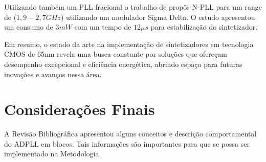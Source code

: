 Utilizando também um PLL fracional o trabalho de \cite{lee2017design} propôs N-PLL para um range de ($1,9-2,7GHz$) utilizando um modulador Sigma Delta.  O estudo apresentou um consumo de $3mW$ com um tempo de $12\mu s$ para estabilização do sintetizador.


Em resumo, o estado da arte na implementação de sintetizadores em tecnologia CMOS de 65nm revela uma busca constante por soluções que ofereçam desempenho excepcional e eficiência energética, abrindo espaço para futuras inovações e avanços nessa área.

%
%
%
%

\section{Considerações Finais}

A Revisão Bibliográfica apresentou alguns conceitos e descrição comportamental do ADPLL em blocos. Tais informações são importantes para que se possa ser implementado na Metodologia.


